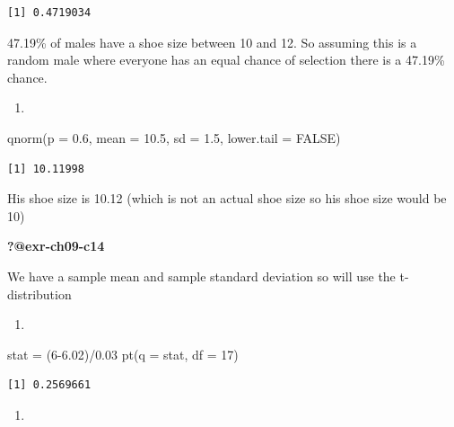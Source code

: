 \documentclass[
  letterpaper,
  DIV=11,
  numbers=noendperiod]{scrreprt}
\newenvironment{Shaded}{\begin{snugshade}}{\end{snugshade}}
\newcommand{\AttributeTok}[1]{\textcolor[rgb]{0.40,0.45,0.13}{#1}}
\newcommand{\ConstantTok}[1]{\textcolor[rgb]{0.56,0.35,0.01}{#1}}
\newcommand{\DecValTok}[1]{\textcolor[rgb]{0.68,0.00,0.00}{#1}}
\newcommand{\FloatTok}[1]{\textcolor[rgb]{0.68,0.00,0.00}{#1}}
\newcommand{\FunctionTok}[1]{\textcolor[rgb]{0.28,0.35,0.67}{#1}}
\newcommand{\NormalTok}[1]{\textcolor[rgb]{0.00,0.23,0.31}{#1}}
\newcommand{\OtherTok}[1]{\textcolor[rgb]{0.00,0.23,0.31}{#1}}
\newcommand{\SpecialCharTok}[1]{\textcolor[rgb]{0.37,0.37,0.37}{#1}}
\providecommand{\tightlist}{%
  \setlength{\itemsep}{0pt}\setlength{\parskip}{0pt}}\usepackage{longtable,booktabs,array}
\theoremstyle{definition}
\theoremstyle{remark}
\begin{document}
\begin{verbatim}
[1] 0.4719034
\end{verbatim}

47.19\% of males have a shoe size between 10 and 12. So assuming this is
a random male where everyone has an equal chance of selection there is a
47.19\% chance.

\begin{enumerate}
\def\labelenumi{\alph{enumi})}
\setcounter{enumi}{3}
\tightlist
\item
\end{enumerate}

\begin{Shaded}
\begin{Highlighting}[]
\FunctionTok{qnorm}\NormalTok{(}\AttributeTok{p =} \FloatTok{0.6}\NormalTok{, }\AttributeTok{mean =} \FloatTok{10.5}\NormalTok{, }\AttributeTok{sd =} \FloatTok{1.5}\NormalTok{, }\AttributeTok{lower.tail =} \ConstantTok{FALSE}\NormalTok{)}
\end{Highlighting}
\end{Shaded}

\begin{verbatim}
[1] 10.11998
\end{verbatim}

His shoe size is 10.12 (which is not an actual shoe size so his shoe
size would be 10)

\textbf{?@exr-ch09-c14}

We have a sample mean and sample standard deviation so will use the
t-distribution

\begin{enumerate}
\def\labelenumi{\alph{enumi})}
\tightlist
\item
\end{enumerate}

\begin{Shaded}
\begin{Highlighting}[]
\NormalTok{stat }\OtherTok{=}\NormalTok{ (}\DecValTok{6}\FloatTok{{-}6.02}\NormalTok{)}\SpecialCharTok{/}\FloatTok{0.03}
\FunctionTok{pt}\NormalTok{(}\AttributeTok{q =}\NormalTok{ stat, }\AttributeTok{df =} \DecValTok{17}\NormalTok{)}
\end{Highlighting}
\end{Shaded}

\begin{verbatim}
[1] 0.2569661
\end{verbatim}

\begin{enumerate}
\def\labelenumi{\alph{enumi})}
\setcounter{enumi}{1}
\tightlist
\item
\end{enumerate}
\end{document}
